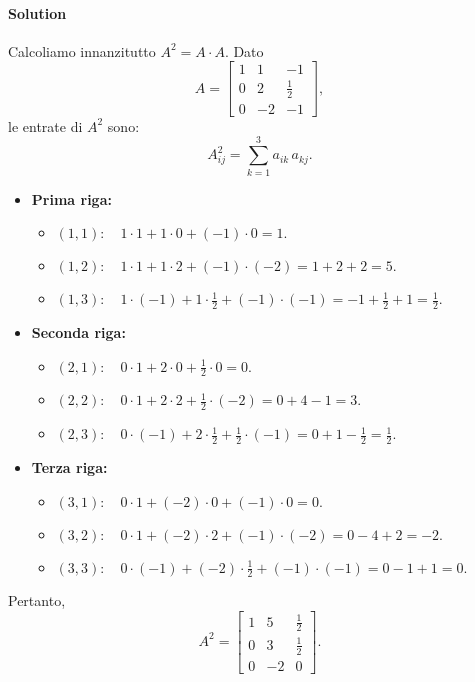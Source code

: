 \documentclass{article}
\theoremstyle{plain}
\theoremstyle{definition}
\theoremstyle{remark}
\begin{document}
\paragraph{Solution}
Calcoliamo innanzitutto \(A^2=A\cdot A\). Dato
\[
A=\begin{bmatrix}
1 & 1 & -1\\[4mm]
0 & 2 & \frac{1}{2}\\[4mm]
0 & -2 & -1
\end{bmatrix},
\]
le entrate di \(A^2\) sono:
\[
A^2_{ij}=\sum_{k=1}^3 a_{ik}\,a_{kj}.
\]
\begin{itemize}
    \item \textbf{Prima riga:}
    \begin{itemize}
        \item \((1,1):\quad 1\cdot 1 + 1\cdot 0 + (-1)\cdot 0 = 1.\)
        \item \((1,2):\quad 1\cdot 1 + 1\cdot 2 + (-1)\cdot (-2) = 1+2+2 = 5.\)
        \item \((1,3):\quad 1\cdot (-1) + 1\cdot \frac{1}{2} + (-1)\cdot (-1) = -1+\frac{1}{2}+1 = \frac{1}{2}.\)
    \end{itemize}
    \item \textbf{Seconda riga:}
    \begin{itemize}
        \item \((2,1):\quad 0\cdot 1 + 2\cdot 0 + \frac{1}{2}\cdot 0 = 0.\)
        \item \((2,2):\quad 0\cdot 1 + 2\cdot 2 + \frac{1}{2}\cdot (-2) = 0+4-1 = 3.\)
        \item \((2,3):\quad 0\cdot (-1) + 2\cdot \frac{1}{2} + \frac{1}{2}\cdot (-1) = 0+1-\frac{1}{2} = \frac{1}{2}.\)
    \end{itemize}
    \item \textbf{Terza riga:}
    \begin{itemize}
        \item \((3,1):\quad 0\cdot 1 + (-2)\cdot 0 + (-1)\cdot 0 = 0.\)
        \item \((3,2):\quad 0\cdot 1 + (-2)\cdot 2 + (-1)\cdot (-2) = 0-4+2 = -2.\)
        \item \((3,3):\quad 0\cdot (-1) + (-2)\cdot \frac{1}{2} + (-1)\cdot (-1) = 0-1+1 = 0.\)
    \end{itemize}
\end{itemize}
Pertanto,
\[
A^2=
\begin{bmatrix}
1 & 5 & \frac{1}{2}\\[4mm]
0 & 3 & \frac{1}{2}\\[4mm]
0 & -2 & 0
\end{bmatrix}.
\]
\end{document}
